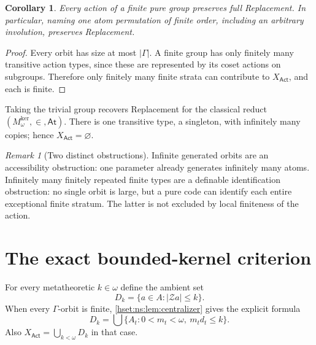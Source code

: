 \documentclass[11pt,letterpaper]{article}
\newtheorem{corollary}[corollary]{Corollary}\aliascntresetthe{corollary}
\theoremstyle{definition}
\theoremstyle{remark}
\newtheorem{remark}[remark]{Remark}\aliascntresetthe{remark}
\newcommand{\lbl}[1]{\nolinkurl{#1}}
\newcommand{\repo}[1]{\nolinkurl{#1}}
\newcommand{\Mker}{M^{\mathrm{ker}}}
\newcommand{\At}{\mathsf{At}}
\newcommand{\Act}{\mathsf{Act}}
\newcommand{\abs}[1]{\lvert #1\rvert}
\begin{document}
\begin{corollary}\label{hset:ns:cor:finitegroup}
Every action of a finite pure group preserves full Replacement. In particular, naming one atom permutation of finite order, including an arbitrary involution, preserves Replacement.
\end{corollary}
\begin{proof}
Every orbit has size at most $\abs{\Gamma}$. A finite group has only finitely many transitive action types, since these are represented by its coset actions on subgroups. Therefore only finitely many finite strata can contribute to $X_{\Act}$, and each is finite.
\end{proof}


\noindent[Added 4 October 2026, batch~93: Corollary~15.4 of
\repo{naming-elementary-embeddings} (Part~II, \lbl{nee:ca:cor:finite-group}),
written later and independently, is this corollary for finitely many named
permutations generating a finite group, at every infinite kernel bound
$\kappa$, not only at $\kappa=\omega$.]

Taking the trivial group recovers Replacement for the classical reduct $(\Mker_\omega,\in,\At)$. There is one transitive type, a singleton, with infinitely many copies; hence $X_{\Act}=\varnothing$.

\begin{remark}[Two distinct obstructions]
Infinite generated orbits are an accessibility obstruction: one parameter already generates infinitely many atoms. Infinitely many finitely repeated finite types are a definable identification obstruction: no single orbit is large, but a pure code can identify each entire exceptional finite stratum. The latter is not excluded by local finiteness of the action.
\end{remark}

\section{The exact bounded-kernel criterion}
\label{hset:ns:sec:graded}
For every metatheoretic $k\in\omega$ define the ambient set
\[
 D_k=\{a\in A:\abs{\mathcal Z a}\le k\}.
\]
When every $\Gamma$-orbit is finite, \cref{hset:ns:lem:centralizer} gives the explicit formula
\begin{equation}\label{hset:ns:eq:Dk}
 D_k=\bigcup\{A_t:0<m_t<\omega,\ m_td_t\le k\}.
\end{equation}
Also $X_{\Act}=\bigcup_{k<\omega}D_k$ in that case.
\end{document}
